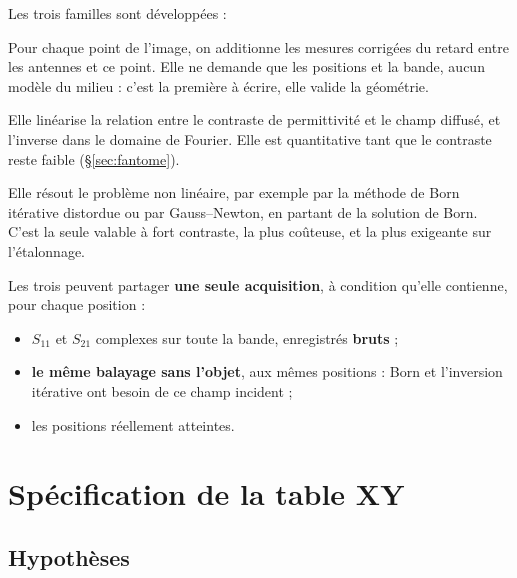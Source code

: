 \documentclass[11pt,a4paper]{article}
\begin{document}
Les trois familles sont développées :

\begin{description}[style=nextline, leftmargin=1.2em]
\item[Rétroprojection (sommation cohérente)]
  Pour chaque point de l'image, on additionne les mesures corrigées du retard
  entre les antennes et ce point. Elle ne demande que les positions et la bande,
  aucun modèle du milieu : c'est la première à écrire, elle valide la géométrie.
\item[Méthode de Born (holographie, tomographie par diffraction)]
  Elle linéarise la relation entre le contraste de permittivité et le champ
  diffusé, et l'inverse dans le domaine de Fourier. Elle est quantitative tant
  que le contraste reste faible (\S\ref{sec:fantome}).
\item[Inversion itérative]
  Elle résout le problème non linéaire, par exemple par la méthode de Born
  itérative distordue ou par Gauss--Newton, en partant de la solution de Born.
  C'est la seule valable à fort contraste, la plus coûteuse, et la plus
  exigeante sur l'étalonnage.
\end{description}

Les trois peuvent partager \textbf{une seule acquisition}, à condition qu'elle
contienne, pour chaque position :

\begin{itemize}
\item $S_{11}$ et $S_{21}$ complexes sur toute la bande, enregistrés
      \textbf{bruts} ;
\item \textbf{le même balayage sans l'objet}, aux mêmes positions : Born et
      l'inversion itérative ont besoin de ce champ incident ;
\item les positions réellement atteintes.
\end{itemize}

\section{Spécification de la table XY}
\label{sec:table}

\subsection{Hypothèses}
\end{document}
